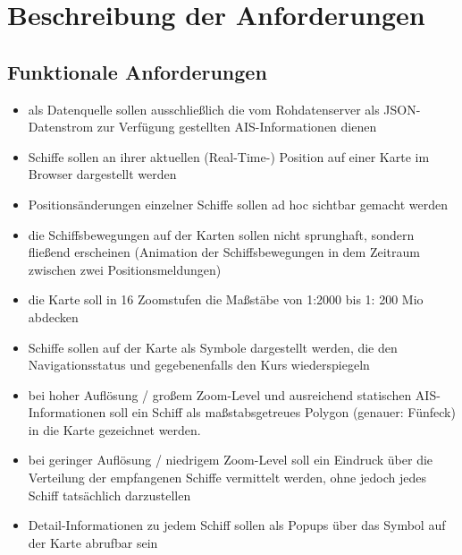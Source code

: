 \section{Beschreibung der Anforderungen}\label{s.Beschreibung der Anforderungen}


\subsection{Funktionale Anforderungen}\label{Funktionale Anforderungen}
\begin{itemize}

\item als Datenquelle sollen ausschließlich die vom Rohdatenserver als JSON-Datenstrom zur Verfügung gestellten AIS-Informationen dienen
\item Schiffe sollen an ihrer aktuellen (Real-Time-) Position auf einer Karte im Browser dargestellt werden
\item Positionsänderungen einzelner Schiffe sollen ad hoc sichtbar gemacht werden
\item die Schiffsbewegungen auf der Karten sollen nicht sprunghaft, sondern fließend erscheinen (Animation der Schiffsbewegungen in dem Zeitraum zwischen zwei Positionsmeldungen)
\item die Karte soll in 16 Zoomstufen die Maßstäbe von 1:2000 bis 1: 200 Mio abdecken
\item Schiffe sollen auf der Karte als Symbole dargestellt werden, die den Navigationsstatus und gegebenenfalls den Kurs wiederspiegeln
\item bei hoher Auflösung / großem Zoom-Level und ausreichend statischen AIS-Informationen soll ein Schiff als maßstabsgetreues Polygon (genauer: Fünfeck) in die Karte gezeichnet werden.
\item bei geringer Auflösung / niedrigem Zoom-Level soll ein Eindruck über die Verteilung der empfangenen Schiffe vermittelt werden, ohne jedoch jedes Schiff tatsächlich darzustellen
\item Detail-Informationen zu jedem Schiff sollen als Popups über das Symbol auf der Karte abrufbar sein
\end{itemize}

